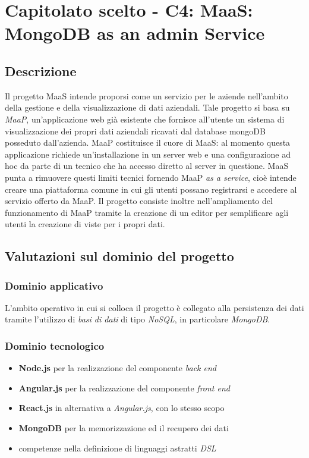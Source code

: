 \section{Capitolato scelto - C4: MaaS: MongoDB as an admin Service}
\subsection{Descrizione}
Il progetto MaaS intende proporsi come un servizio per le aziende nell'ambito della gestione e della visualizzazione di dati aziendali. 
Tale progetto si basa su \textit{MaaP}, un'applicazione web gi\`a esistente che fornisce all'utente un sistema di visualizzazione
dei propri dati aziendali ricavati dal database mongoDB posseduto dall'azienda.
MaaP costituisce il cuore di MaaS: al momento questa applicazione richiede un'installazione in un server web e 
una configurazione ad hoc da parte di un tecnico che ha accesso diretto al server in questione. MaaS punta a rimuovere 
questi limiti tecnici fornendo MaaP \textit{as a service}, cioè intende creare una piattaforma comune in cui gli utenti possano 
registrarsi e accedere al servizio offerto da MaaP. Il progetto consiste inoltre nell'ampliamento del funzionamento di MaaP tramite la creazione di 
un editor per semplificare agli utenti la creazione di viste per i propri dati.


\subsection{Valutazioni sul dominio del progetto}
\subsubsection{Dominio applicativo}
L'ambito operativo in cui si colloca il progetto \`e collegato alla persistenza dei dati tramite l'utilizzo
di \textit{basi di dati} di tipo \textit{NoSQL}, in particolare \textit{MongoDB}.

\subsubsection{Dominio tecnologico}
\begin{itemize}
\item \textbf{Node.js} per la realizzazione del componente \textit{back end}
\item \textbf{Angular.js} per la realizzazione del componente \textit{front end}
\item \textbf{React.js} in alternativa a \textit{Angular.js}, con lo stesso scopo
\item \textbf{MongoDB} per la memorizzazione ed il recupero dei dati
\item competenze nella definizione di linguaggi astratti \textit{DSL}
\end{itemize}


